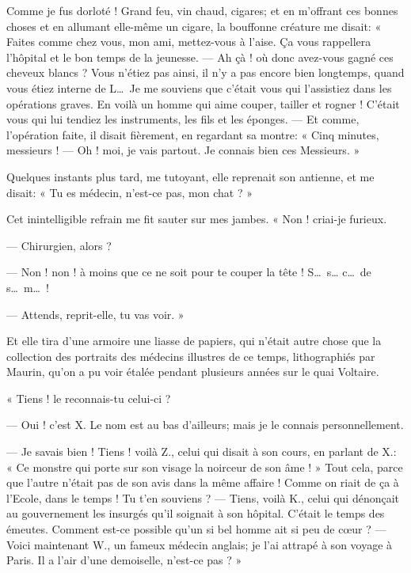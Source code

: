 Comme je fus dorloté ! Grand feu, vin chaud, cigares; et en
m’offrant ces bonnes choses et en allumant elle{}-même
un cigare, la bouffonne créature me disait: « Faites comme chez vous,
mon ami, mettez{}-vous à l’aise. Ça vous rappellera
l’hôpital et le bon temps de la jeunesse. --- Ah çà ! où
donc avez{}-vous gagné ces cheveux blancs ? Vous
n’étiez pas ainsi, il n’y a pas
encore bien longtemps, quand vous étiez interne de L\ldots\ Je me souviens
que c’était vous qui l’assistiez dans
les opérations graves. En voilà un homme qui aime couper, tailler et
rogner ! C’était vous qui lui tendiez les instruments,
les fils et les éponges. --- Et comme, l’opération
faite, il disait fièrement, en regardant sa montre: « Cinq minutes,
messieurs ! --- Oh ! moi, je vais partout. Je connais bien ces Messieurs.
»

Quelques instants plus tard, me tutoyant, elle reprenait son antienne,
et me disait: « Tu es médecin, n’est{}-ce pas, mon
chat ? »

Cet inintelligible refrain me fit sauter sur mes jambes. « Non !
criai{}-je furieux.

--- Chirurgien, alors ?

--- Non ! non ! à moins que ce ne soit pour te couper la tête ! S\ldots\ s\ldots
c\ldots\ de s\ldots\ m\ldots\ !

--- Attends, reprit{}-elle, tu vas voir. »

Et elle tira d’une armoire une liasse de papiers, qui
n’était autre chose que la collection des portraits
des médecins illustres de ce temps, lithographiés par Maurin,
qu’on a pu voir étalée pendant plusieurs années sur le
quai Voltaire.

« Tiens ! le reconnais{}-tu celui{}-ci ?

--- Oui ! c’est X. Le nom est au bas
d’ailleurs; mais je le connais personnellement.

--- Je savais bien ! Tiens ! voilà Z., celui qui disait à son cours, en
parlant de X.: « Ce monstre qui porte sur son visage la noirceur de son
âme ! » Tout cela, parce que l’autre
n’était pas de son avis dans la même affaire ! Comme
on riait de ça à l’Ecole, dans le temps ! Tu
t’en souviens ? --- Tiens, voilà K., celui qui dénonçait
au gouvernement les insurgés qu’il soignait à son
hôpital. C’était le temps des émeutes. Comment
est{}-ce possible qu’un si bel homme ait si peu de
c\oe ur ? --- Voici maintenant W., un fameux médecin anglais; je
l’ai attrapé à son voyage à Paris. Il a
l’air d’une demoiselle,
n’est{}-ce pas ? »

